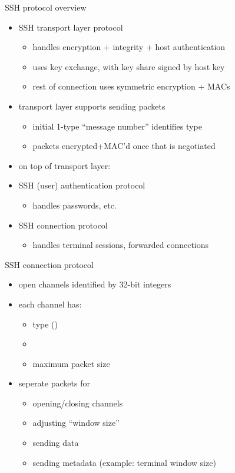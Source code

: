 \begin{frame}{SSH protocol overview}
    \begin{itemize}
    \item SSH transport layer protocol
        \begin{itemize}
        \item handles encryption + integrity + host authentication
        \item uses key exchange, with key share signed by host key
        \item rest of connection uses symmetric encryption + MACs 
        \end{itemize}
    \item transport layer supports sending packets
        \begin{itemize}
        \item initial 1-type ``message number'' identifies type
        \item packets encrypted+MAC'd once that is negotiated
        \end{itemize}
    \item on top of transport layer:
    \vspace{.5cm}
    \item SSH (user) authentication protocol
        \begin{itemize}
        \item handles passwords, etc.
        \end{itemize}
    \item SSH connection protocol
        \begin{itemize}
        \item handles terminal sessions, forwarded connections
        \end{itemize}
    \end{itemize}
\end{frame}

\begin{frame}{SSH connection protocol}
\begin{itemize}
    \item open channels identified by 32-bit integers
    \item each channel has:
        \begin{itemize}
        \item type ()
        \item {}
        \item maximum packet size
        \end{itemize}
    \item seperate packets for
        \begin{itemize}
        \item opening/closing channels
        \item adjusting ``window size''
        \item sending data
        \item sending metadata (example: terminal window size)
        \end{itemize}
    \end{itemize}
\end{frame}

